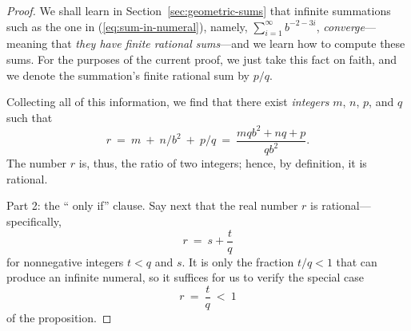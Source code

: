 \begin{proof}
We shall learn in Section~\ref{sec:geometric-sums} that infinite
summations such as the one in (\ref{eq:sum-in-numeral}), namely,
$\sum_{i=1}^\infty b^{-2-3i}$,
{\em converge}---meaning that {\em they have finite rational
  sums}---and we learn how to compute these sums.  For the purposes of
the current proof, we just take this fact on faith, and we denote the
summation's finite rational sum by $p/q$.

Collecting all of this information, we find that there exist {\em
  integers} $m$, $n$, $p$, and $q$ such that
\[ r \ = \ m \ + \ n/ b^{2} \ + \ p/q \ = \
\frac{mqb^2 + nq + p}{qb^2}. \]
The number $r$ is, thus, the ratio of two integers; hence, by
definition, it is rational.

\bigskip

\noindent
{\small\sf Part 2: the `` only if'' clause.}
Say next that the real number $r$ is rational---specifically,
\[ r \ = \ s + \frac{t}{q} \]
for nonnegative integers $t < q$ and $s$.  It is only the fraction
$t/q < 1$ that can produce an infinite numeral, so it suffices for us
to verify the special case
\[ r \ = \ \frac{t}{q} \ < \ 1 \]
of the proposition.


\end{proof}

